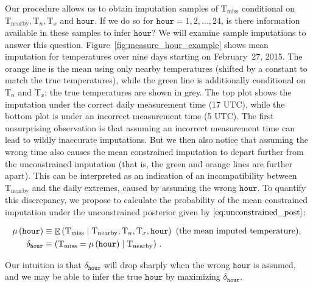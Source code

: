 \documentclass[letter]{article}
\newcommand{\genericdel}[3]{%
      \left#1#3\right#2
    }
\newcommand{\del}[1]{\genericdel(){#1}}
\let\Pr\relax
\DeclareMathOperator{\Pr}{\mathbb{P}}
\DeclareMathOperator{\E}{\mathbb{E}}
\newcommand{\T}{\mathrm{T}}
\newcommand{\Tn}{\T_{n}}
\newcommand{\Tx}{\T_{x}}
\newcommand{\miss}{\mathrm{miss}}
\newcommand{\obs}{\mathrm{nearby}}
\newcommand{\hour}{\mathtt{hour}}
\newcommand{\discrepancy}{\delta}
\begin{document}
Our procedure allows us to obtain imputation samples of \(\T_\miss\) conditional on \(\T_\obs,\Tn,\Tx\) and \(\hour\).
If we do so for \(\hour=1,2,\ldots,24\), is there information available in these samples to infer \(\hour\)?
We will examine sample imputations to answer this question.
Figure~\ref{fig:measure_hour_example} shows mean imputation for temperatures over nine days starting on February~27, 2015. The orange line is the mean using only nearby temperatures (shifted by a constant to match the true temperatures), while the green line is additionally conditional on \(\Tn\) and \(\Tx\); the true temperatures are shown in grey.
The top plot shows the imputation under the correct daily measurement time (17 UTC), while the bottom plot is under an incorrect measurement time (5 UTC).
The first unsurprising observation is that assuming an incorrect measurement time can lead to wildly inaccurate imputations.
But we then also notice that assuming the wrong time also causes the mean constrained imputation to depart further from the unconstrained imputation
(that is, the green and orange lines are further apart).
This can be interpreted as an indication of an incompatibility between \(\T_\obs\) and the daily extremes, caused by assuming the wrong \(\hour\).
To quantify this discrepancy, we propose to calculate the probability of the mean constrained imputation under the unconstrained posterior given by \(\eqref{eq:unconstrained_post}\):

\begin{equation}
\begin{split}
    \mu\del{\hour} &\equiv \E\del{ \T_\miss \mid \T_\obs, \Tn, \Tx, \hour } \text{ (the mean imputed temperature), }\\
    \discrepancy_\hour &\equiv \Pr\del{ \T_\miss = \mu\del{\hour} \mid \T_\obs }\,.
\end{split}
\end{equation}

Our intuition is that \(\discrepancy_\hour\) will drop sharply when the wrong \(\hour\) is assumed,
and we may be able to infer the true \(\hour\) by maximizing \(\discrepancy_\hour\).
    
\end{document}
